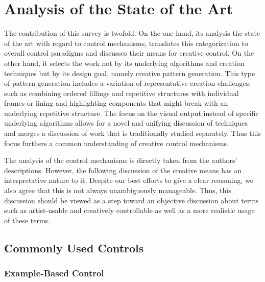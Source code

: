 

\section{Analysis of the State of the Art}
\label{sec:analysis}


The contribution of this survey is twofold. On the one hand, its analysis the state of the art with regard to control mechanisms, translates this categorization to overall control paradigms and discusses their means for creative control. On the other hand, it selects the work not by its underlying algorithms and creation techniques but by its design goal, namely creative pattern generation. This type of pattern generation includes a variation of representative creation challenges, such as combining ordered fillings and repetitive structures with individual frames or lining and highlighting components that might break with an underlying repetitive structure. The focus on the visual output instead of specific underlying algorithms allows for a novel and unifying discussion of techniques and merges a discussion of work that is traditionally studied separately. Thus this focus furthers a common understanding of creative control mechanisms.

The analysis of the control mechanisms is directly taken from the authors' descriptions. However, the following discussion of the creative means has an interpretative nature to it. Despite our best efforts to give a clear reasoning, we also agree that this is not always unambiguously manageable. Thus, this discussion should be viewed as a step toward an objective discussion about terms such as artist-usable and creatively controllable as well as a more realistic usage of these terms.


\subsection{Commonly Used Controls}
\label{subsec:commonly_used_control_mechanisms}


\subsubsection{Example-Based Control}
\label{subsubsec:commonly_used_control_mechanisms_example}

